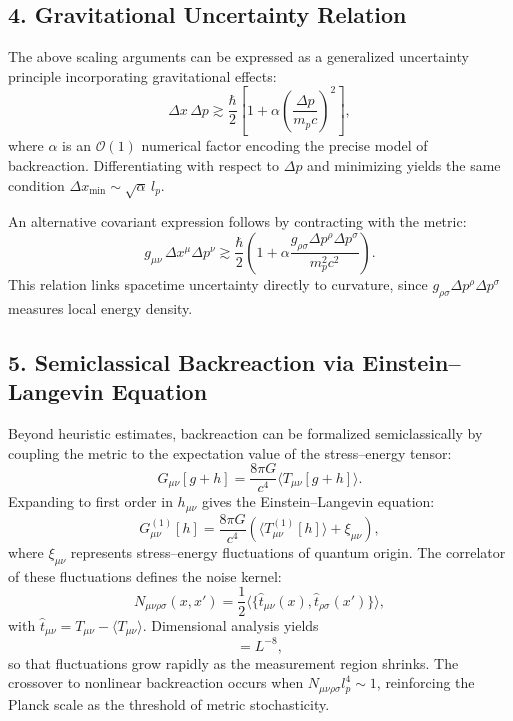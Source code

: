 \documentclass[11pt,oneside]{book}
\numberwithin{equation}{chapter}
\begin{document}
\subsection*{4. Gravitational Uncertainty Relation}

The above scaling arguments can be expressed as a generalized uncertainty principle incorporating gravitational effects:
\begin{equation}
\Delta x\,\Delta p \gtrsim 
\frac{\hbar}{2}
\left[1 + \alpha
\left(\frac{\Delta p}{m_p c}\right)^2\right],
\end{equation}
where $\alpha$ is an $\mathcal{O}(1)$ numerical factor encoding the precise model of backreaction.  
Differentiating with respect to $\Delta p$ and minimizing yields the same condition $\Delta x_{\min} \sim \sqrt{\alpha}\,l_p$.

An alternative covariant expression follows by contracting with the metric:
\begin{equation}
g_{\mu\nu}\,\Delta x^\mu \Delta p^\nu
\gtrsim \frac{\hbar}{2}
\left(1 + \alpha\frac{g_{\rho\sigma}\Delta p^\rho \Delta p^\sigma}{m_p^2 c^2}\right).
\end{equation}
This relation links spacetime uncertainty directly to curvature, since $g_{\rho\sigma}\Delta p^\rho \Delta p^\sigma$ measures local energy density.

\subsection*{5. Semiclassical Backreaction via Einstein–Langevin Equation}

Beyond heuristic estimates, backreaction can be formalized semiclassically by coupling the metric to the expectation value of the stress–energy tensor:
\begin{equation}
G_{\mu\nu}[g+h] = \frac{8\pi G}{c^4}\langle T_{\mu\nu}[g+h] \rangle.
\end{equation}
Expanding to first order in $h_{\mu\nu}$ gives the Einstein–Langevin equation:
\begin{equation}
G^{(1)}_{\mu\nu}[h] = 
\frac{8\pi G}{c^4}
\left(\langle T^{(1)}_{\mu\nu}[h]\rangle
+ \xi_{\mu\nu}\right),
\end{equation}
where $\xi_{\mu\nu}$ represents stress–energy fluctuations of quantum origin.  
The correlator of these fluctuations defines the noise kernel:
\begin{equation}
N_{\mu\nu\rho\sigma}(x,x')
= \frac{1}{2}
\langle \{\hat{t}_{\mu\nu}(x), \hat{t}_{\rho\sigma}(x')\} \rangle,
\end{equation}
with $\hat{t}_{\mu\nu} = T_{\mu\nu} - \langle T_{\mu\nu}\rangle$.  
Dimensional analysis yields
\begin{equation}
[N_{\mu\nu\rho\sigma}] = L^{-8},
\end{equation}
so that fluctuations grow rapidly as the measurement region shrinks.  
The crossover to nonlinear backreaction occurs when $N_{\mu\nu\rho\sigma}l_p^4 \sim 1$, reinforcing the Planck scale as the threshold of metric stochasticity.
\end{document}
